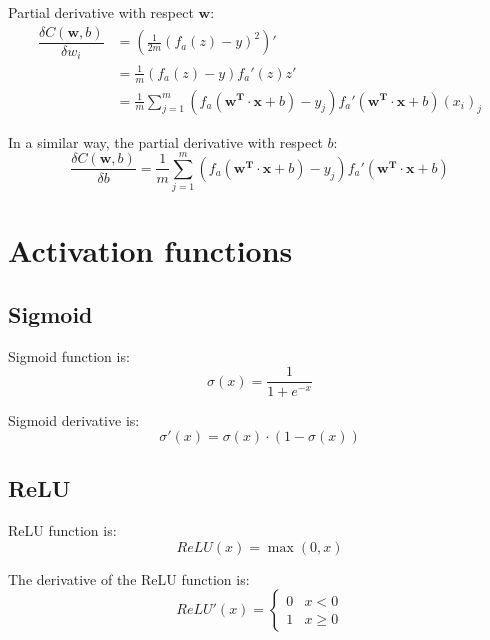 \documentclass{article}
\begin{document}
Partial derivative with respect $\mathbf{w}$:
\begin{align}
  \dfrac{\delta C(\mathbf{w},b)}{\delta w_i}
  &= \left( \frac{1}{2m} \left(f_a(z) - y\right)^2 \right)' \nonumber \\
  &= \frac{1}{m} \left(f_a(z) - y\right) f_a'(z) z' \nonumber \\
  &= \frac{1}{m} \sum_{j=1}^m \left(f_a(\mathbf{w^T \cdot x} + b) - y_j\right) f_a'(\mathbf{w^T \cdot x} + b) (x_i)_j
\end{align}

In a similar way, the partial derivative with respect $b$:
\begin{equation}
  \dfrac{\delta C(\mathbf{w},b)}{\delta b} = \frac{1}{m} \sum_{j=1}^m \left(f_a(\mathbf{w^T \cdot x} + b) - y_j\right) f_a'(\mathbf{w^T \cdot x} + b)
\end{equation}

\section*{Activation functions}

\subsection*{Sigmoid}

Sigmoid function is:
\begin{equation}
  \sigma(x) = \frac{1}{1 + e^{-x}}
\end{equation}

Sigmoid derivative is:
\begin{equation}
  \sigma'(x) = \sigma(x) \cdot (1 - \sigma(x))  
\end{equation}

\subsection*{ReLU}

ReLU function is:
\begin{equation}
  ReLU(x) = \max(0,x)
\end{equation}

The derivative of the ReLU function is:
\begin{equation}
  ReLU'(x) = \begin{cases} 
    0 & x < 0 \\
    1 & x\geq 0 
  \end{cases}
\end{equation}
\end{document}
